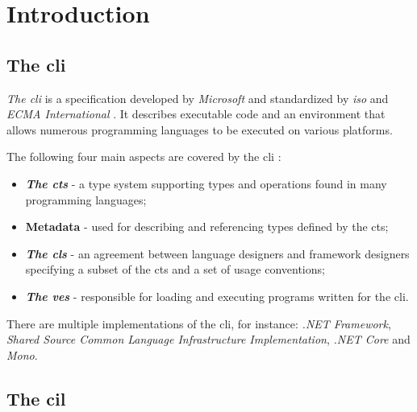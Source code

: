 \documentclass{article}
\numberwithin{equation}{section}
\begin{document}

\section{Introduction}

\subsection{The \acrlong{cli}}

\textit{The \acrfull{cli}} is a specification developed by \textit{Microsoft} and standardized by \textit{\acrshort{iso}} and \textit{ECMA International} \cite{isoStandard, ecmaStandard}. It describes executable code and an environment that allows numerous programming languages to be executed on various platforms.

The following four main aspects are covered by the \acrlong{cli} \cite{ecmaStandard}:
\begin{itemize}
	\item{
		\textbf{\textit{The \acrfull{cts}}} - a type system supporting types and operations found in many programming languages;
	}
	\item{
		\textbf{Metadata} - used for describing and referencing types defined by the \acrshort{cts};
	}
	\item{
		\textbf{\textit{The \acrfull{cls}}} - an agreement between language designers and framework designers specifying a subset of the \acrshort{cts} and a set of usage conventions;
	}
	\item{
		\textbf{\textit{The \acrfull{ves}}} - responsible for loading and executing programs written for the \acrshort{cli}.
	}
\end{itemize}

There are multiple implementations of the \acrshort{cli}, for instance: \textit{.NET Framework}, \textit{Shared Source Common Language Infrastructure Implementation}, \textit{.NET Core} and \textit{Mono}.

\subsection{The \acrlong{cil}}
\end{document}

